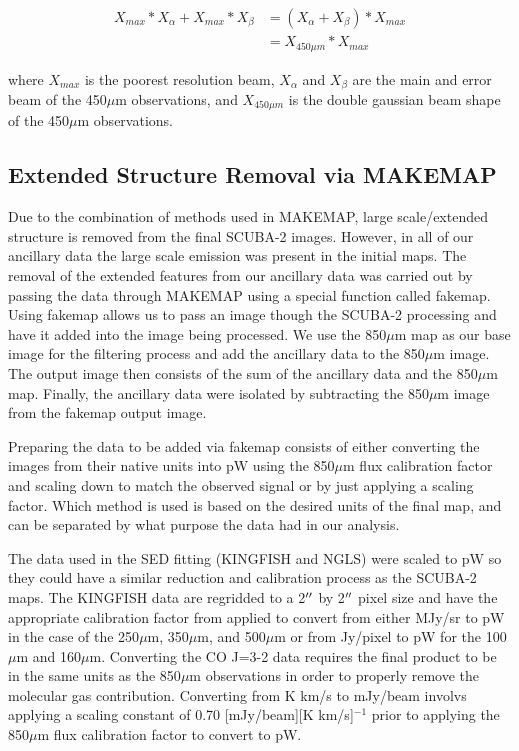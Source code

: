\begin{equation} \label{eq_GBSmethod}
  \begin{split}
    X_{max} \ast X_{\alpha} + X_{max} \ast X_{\beta} & = \left(X_{\alpha} + X_{\beta}\right) \ast X_{max} \\
     & = X_{450\mu m} \ast X_{max}
   \end{split}
\end{equation}

\noindent where $X_{max}$ is the poorest resolution beam, $X_{\alpha}$ and $X_{\beta}$ are the main and error beam of the 450$\mu$m observations, and $X_{450\mu m}$ is the double gaussian beam shape of the 450$\mu$m observations.

\subsection{Extended Structure Removal via MAKEMAP}\label{fakesource_sec}


Due to the combination of methods used in MAKEMAP, large scale/extended structure is removed from the final SCUBA-2 images.  However, in all of our ancillary data the large scale emission was present in the initial maps.  The removal of the extended features from our ancillary data was carried out by passing the data through MAKEMAP using a special function called fakemap.  Using fakemap allows us to pass an image though the SCUBA-2 processing and have it added into the image being processed.  We use the 850$\mu$m map as our base image for the filtering process and add the ancillary data to the 850$\mu$m image.  The output image then consists of the sum of the ancillary data and the 850$\mu$m map.  Finally, the ancillary data were isolated by subtracting the 850$\mu$m image from the fakemap output image.  

Preparing the data to be added via fakemap consists of either converting the images from their native units into pW using the 850$\mu$m flux calibration factor and scaling down to match the observed signal or by just applying a scaling factor.  Which method is used is based on the desired units of the final map, and can be separated by what purpose the data had in our analysis.

The data used in the SED fitting (KINGFISH and NGLS) were scaled to pW so they could have a similar reduction and calibration process as the SCUBA-2 maps.   The KINGFISH data are regridded to a 2$\mbox{$^{\prime\prime}$}$ by 2$\mbox{$^{\prime\prime}$}$ pixel size and have the appropriate calibration factor from \cite{dempsey2013} applied to convert from either MJy/sr to pW in the case of the 250$\mu$m, 350$\mu$m, and 500$\mu$m or from Jy/pixel to pW for the 100$\mu$m and 160$\mu$m.  Converting the CO J=3-2 data requires the final product to be in the same units as the 850$\mu$m observations in order to properly remove the molecular gas contribution.  Converting from K km/s to mJy/beam involvs applying a scaling constant of 0.70 [mJy/beam][K km/s]$^{-1}$ \citep{drabek2012} prior to applying the 850$\mu$m flux calibration factor to convert to pW.  

